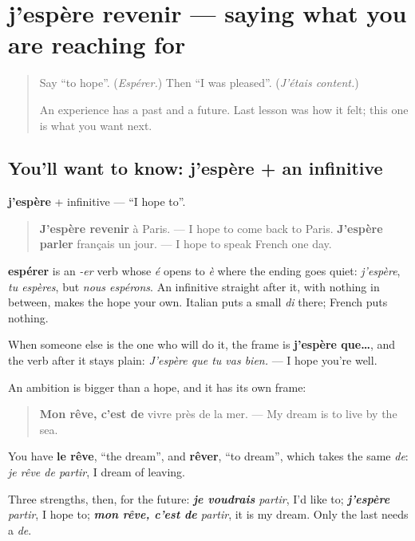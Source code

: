 \section[j'espère revenir]{j'espère revenir — saying what you are reaching for}

\label{lesson:FR-C264-jespere}



\begin{quote}
Say \textquotedblleft{}to hope\textquotedblright{}. (\emph{Espérer.}) Then \textquotedblleft{}I was pleased\textquotedblright{}. (\emph{J'étais content.})

An experience has a past and a future. Last lesson was how it felt; this one is what you want next.
\end{quote}

\subsection*{You'll want to know: j'espère + an infinitive}
\textbf{j'espère} + infinitive — \textquotedblleft{}I hope to\textquotedblright{}.

\begin{quote}
\textbf{J'espère revenir} à Paris. — I hope to come back to Paris. \textbf{J'espère parler} français un jour. — I hope to speak French one day.
\end{quote}

\textbf{espérer} is an \emph{-er} verb whose \emph{é} opens to \emph{è} where the ending goes quiet: \emph{j'espère}, \emph{tu espères}, but \emph{nous espérons}. An infinitive straight after it, with nothing in between, makes the hope your own. Italian puts a small \emph{di} there; French puts nothing.

When someone else is the one who will do it, the frame is \textbf{j'espère que…}, and the verb after it stays plain: \emph{J'espère que tu vas bien.} — I hope you're well.

\begin{grammarlens}[title={Grammar Lens: mon rêve, c'est de…}]
An ambition is bigger than a hope, and it has its own frame:

\begin{quote}
\textbf{Mon rêve, c'est de} vivre près de la mer. — My dream is to live by the sea.
\end{quote}

You have \textbf{le rêve}, \textquotedblleft{}the dream\textquotedblright{}, and \textbf{rêver}, \textquotedblleft{}to dream\textquotedblright{}, which takes the same \emph{de}: \emph{je rêve de partir}, I dream of leaving.

Three strengths, then, for the future: \emph{\textbf{je voudrais} partir}, I'd like to; \emph{\textbf{j'espère} partir}, I hope to; \emph{\textbf{mon rêve, c'est de} partir}, it is my dream. Only the last needs a \emph{de}.
\end{grammarlens}

